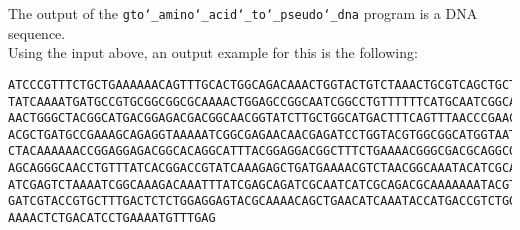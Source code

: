 The output of the \texttt{gto\char`_amino\char`_acid\char`_to\char`_pseudo\char`_dna} program is a DNA sequence.\\
Using the input above, an output example for this is the following:
\begin{lstlisting}
ATCCCGTTTCTGCTGAAAAAACAGTTTGCACTGGCAGACAAACTGGTACTGTCTAAACTGCGTCAGCTGCTGGGCGGCCG
TATCAAAATGATGCCGTGCGGCGGCGCAAAACTGGAGCCGGCAATCGGCCTGTTTTTTCATGCAATCGGCATCAACATCA
AACTGGGCTACGGCATGACGGAGACGACGGCAACGGTATCTTGCTGGCATGACTTTCAGTTTAACCCGAACTCTATCGGC
ACGCTGATGCCGAAAGCAGAGGTAAAAATCGGCGAGAACAACGAGATCCTGGTACGTGGCGGCATGGTAATGAAAGGCTA
CTACAAAAAACCGGAGGAGACGGCACAGGCATTTACGGAGGACGGCTTTCTGAAAACGGGCGACGCAGGCGAGTTTGACG
AGCAGGGCAACCTGTTTATCACGGACCGTATCAAAGAGCTGATGAAAACGTCTAACGGCAAATACATCGCACCGCAGTAC
ATCGAGTCTAAAATCGGCAAAGACAAATTTATCGAGCAGATCGCAATCATCGCAGACGCAAAAAAATACGTATCTGCACT
GATCGTACCGTGCTTTGACTCTCTGGAGGAGTACGCAAAACAGCTGAACATCAAATACCATGACCGTCTGGAGCTGCTGA
AAAACTCTGACATCCTGAAAATGTTTGAG
\end{lstlisting}
